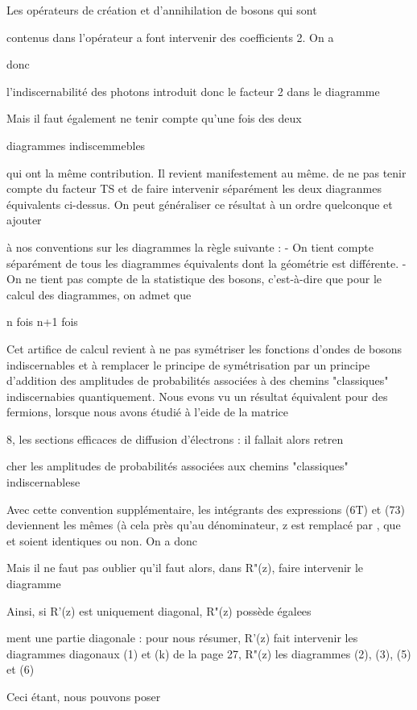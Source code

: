 Les opérateurs de création et d’annihilation de bosons qui sont

contenus dans l'opérateur a font intervenir des coefficients  2. On a

donc

l'indiscernabilité des photons introduit donc le facteur 2 dans le diagramme

Mais il faut également ne tenir compte qu'une fois des deux

diagrammes indiscemmebles

qui ont la même contribution. Il revient manifestement au même. de ne pas
tenir compte du facteur TS et de faire intervenir séparément les deux diagranmes équivalents ci-dessus.
On peut généraliser ce résultat à un ordre quelconque et ajouter

à nos conventions sur les diagrammes la règle suivante :
- On tient compte séparément de tous les diagrammes équivalents dont la géométrie est différente.
- On ne tient pas compte de la statistique des bosons, c'est-à-dire que pour
le calcul des diagrammes, on admet que

n fois n+1 fois

Cet artifice de calcul revient à ne pas symétriser les fonctions
d'ondes de bosons indiscernables et à remplacer le principe de symétrisation
par un principe d'addition des amplitudes de probabilités associées à des
chemins "classiques" indiscernabies quantiquement. Nous evons vu un résultat
équivalent pour des fermions, lorsque nous avons étudié à l'eide de la matrice

8, les sections efficaces de diffusion d'électrons : il fallait alors retren

cher les amplitudes de probabilités associées aux chemins "classiques" indiscernablese

Avec cette convention supplémentaire, les intégrants des expressions
(6T) et (73) deviennent les mêmes (à cela près qu'au dénominateur, z est remplacé par , que  et  soient identiques ou non. On a donc

Mais il ne faut pas oublier qu'il faut alors, dans R"(z), faire
intervenir le diagramme

Ainsi, si R'(z) est uniquement diagonal, R"(z) possède égalees

ment une partie diagonale : pour nous résumer, R'(z) fait intervenir les
diagrammes diagonaux (1) et (k) de la page 27, R"(z) les diagrammes (2),
(3), (5) et (6)

Ceci étant, nous pouvons poser

